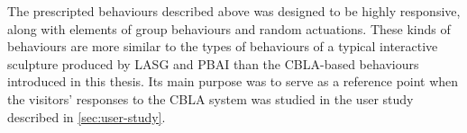 The prescripted behaviours described above was designed to be highly responsive, along with elements of group behaviours and random actuations. These kinds of behaviours are more similar to the types of behaviours of a typical interactive sculpture produced by LASG and PBAI than the CBLA-based behaviours introduced in this thesis. Its main purpose was to serve as a reference point when the visitors' responses to the CBLA system was studied in the user study described in \ref{sec:user-study}.


